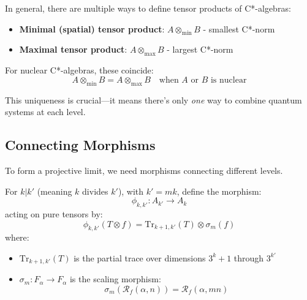 \begin{defn}
\begin{level2}
In general, there are multiple ways to define tensor products of C*-algebras:
\begin{itemize}
\item \textbf{Minimal (spatial) tensor product}: $A \otimes_{\min} B$ - smallest C*-norm
\item \textbf{Maximal tensor product}: $A \otimes_{\max} B$ - largest C*-norm
\end{itemize}

For nuclear C*-algebras, these coincide:
\begin{equation}
A \otimes_{\min} B = A \otimes_{\max} B \quad \text{when $A$ or $B$ is nuclear}
\end{equation}

This uniqueness is crucial—it means there's only \textit{one} way to combine quantum systems at each level\cite{takesaki_theory_2002}.
\end{level2}

\subsection{Connecting Morphisms}

To form a projective limit, we need morphisms connecting different levels.

\begin{defn}\label{def:connecting-morphisms}
For $k | k'$ (meaning $k$ divides $k'$), with $k' = mk$, define the morphism:
\begin{equation}
\phi_{k,k'}: A_{k'} \to A_k
\end{equation}
acting on pure tensors by:
\begin{equation}
\phi_{k,k'}(T \otimes f) = \text{Tr}_{k+1,k'}(T) \otimes \sigma_m(f)
\end{equation}
where:
\begin{itemize}
\item $\text{Tr}_{k+1,k'}(T)$ is the partial trace over dimensions $3^{k}+1$ through $3^{k'}$
\item $\sigma_m: F_\alpha \to F_\alpha$ is the scaling morphism:
\begin{equation}
\sigma_m\left(\mathcal{R}_f(\alpha, n)\right) = \mathcal{R}_f(\alpha, mn)
\end{equation}
\end{itemize}
\end{defn}


\end{defn}
